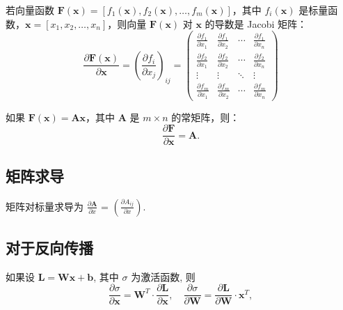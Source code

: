 \begin{definition}
    若向量函数 $ \mathbf{F}(\mathbf{x}) = [f_1(\mathbf{x}), f_2(\mathbf{x}), \dots, f_m(\mathbf{x})] $，其中 $ f_i(\mathbf{x}) $ 是标量函数，$ \mathbf{x} = [x_1, x_2, \dots, x_n] $，则向量 $ \mathbf{F}(\mathbf{x}) $ 对 $ \mathbf{x} $ 的导数是 Jacobi 矩阵：
\begin{equation}
    \frac{\partial \mathbf{F}(\mathbf{x})}{\partial \mathbf{x}} = \left(\frac{\partial f_{i}}{\partial x_{j}}\right)_{ij} = 
    \begin{pmatrix}
        \frac{\partial f_1}{\partial x_1} & \frac{\partial f_1}{\partial x_2} & \cdots & \frac{\partial f_1}{\partial x_n} \\
        \frac{\partial f_2}{\partial x_1} & \frac{\partial f_2}{\partial x_2} & \cdots & \frac{\partial f_2}{\partial x_n} \\
        \vdots & \vdots & \ddots & \vdots \\
        \frac{\partial f_m}{\partial x_1} & \frac{\partial f_m}{\partial x_2} & \cdots & \frac{\partial f_m}{\partial x_n}
    \end{pmatrix}
\end{equation}
\end{definition}

\begin{proposition}
    如果 $\mathbf{F}(\mathbf{x}) = \mathbf{A} \mathbf{x}$，其中 $\mathbf{A}$ 是 $m \times n$ 的常矩阵，则：
    \begin{equation}
        \frac{\partial \mathbf{F}}{\partial \mathbf{x}} = \mathbf{A}.
    \end{equation} 
\end{proposition}

\subsection{矩阵求导}
矩阵对标量求导为 $ \frac{\partial \mathbf A}{\partial x} $ = $ \left( \frac{\partial A_{ij}}{\partial x}\right) $. 

\subsection{对于反向传播}
如果设 $ \mathbf{L} = \mathbf{W} \mathbf{x} + \mathbf{b} $, 其中  $ \sigma $ 为激活函数, 则 
\begin{equation}
    \frac{\partial \sigma}{\partial \mathbf{x}} = \mathbf{W}^{T} \cdot \frac{\partial \mathbf{L}}{\partial \mathbf{x}},  
    \quad
    \frac{\partial \sigma}{\partial \mathbf{W}} = \frac{\partial \mathbf{L}}{\partial \mathbf{W}} \cdot \mathbf{x}^{T},  
\end{equation}

